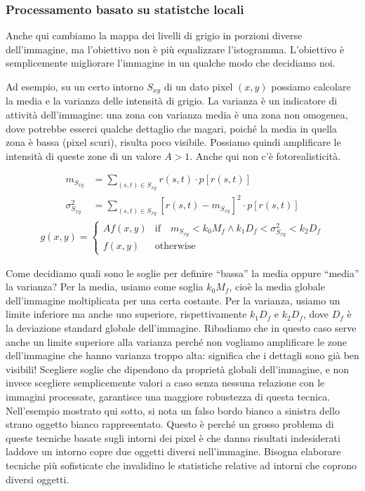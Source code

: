 \documentclass[a4paper,11pt]{article}
\begin{document}
\subsubsection{Processamento basato su statistche locali}
Anche qui cambiamo la mappa dei livelli di grigio in porzioni diverse dell'immagine, ma l'obiettivo non è più equalizzare
l'istogramma. L'obiettivo è semplicemente migliorare l'immagine in un qualche modo che decidiamo noi.
\par
Ad esempio, su un certo intorno $S_{xy}$ di un dato pixel $(x,y)$ possiamo calcolare la media e la varianza delle intensità di grigio.
La varianza è un indicatore di attività dell'immagine: una zona con varianza media è una zona non omogenea, dove potrebbe esserci
qualche dettaglio che magari, poiché la media in quella zona è bassa (pixel scuri), risulta poco visibile. Possiamo quindi amplificare le intensità di queste zone
di un valore $A > 1$. Anche qui non c'è fotorealisticità.

\begin{align*}
m_{S_{xy}} &= \sum_{(s,t) \in S_{xy}} r(s,t) \cdot p[r(s,t)] \\
\sigma^2_{S_{xy}} &= \sum_{(s,t) \in S_{xy}} [r(s,t) - m_{S_{xy}}]^2 \cdot p[r(s,t)]
\end{align*}
\begin{align*}
g(x,y) =  \begin{cases}
        Af(x,y) & \text{if} \quad m_{S_{xy}} < k_0 M_f \land k_1 D_f < \sigma^2_{S_{xy}} < k_2 D_f \\
        f(x,y) & \text{otherwise}
    \end{cases}
\end{align*}

Come decidiamo quali sono le soglie per definire ``bassa'' la media oppure ``media'' la varianza? Per la media, usiamo come
soglia $k_0 M_f$, cioè la media globale dell'immagine moltiplicata per una certa costante. Per la varianza, usiamo un limite inferiore ma
anche uno superiore, rispettivamente $k_1 D_f$ e $k_2 D_f$, dove $D_f$ è la deviazione standard globale dell'immagine.
Ribadiamo che in questo caso serve anche un limite superiore alla varianza perché non vogliamo amplificare le zone dell'immagine che hanno varianza
troppo alta: significa che i dettagli sono già ben visibili! Scegliere soglie che dipendono da proprietà globali dell'immagine, e non invece
scegliere semplicemente valori a caso senza nessuna relazione con le immagini processate, garantisce una maggiore robustezza di questa tecnica.
Nell'esempio mostrato qui sotto, si nota un falso bordo bianco a sinistra dello strano oggetto bianco rappresentato. Questo
è perché un grosso problema di queste tecniche basate sugli intorni dei pixel è che danno risultati indesiderati laddove un intorno copre due oggetti
diversi nell'immagine. Bisogna elaborare tecniche più sofisticate che invalidino le statistiche relative ad intorni che coprono diversi oggetti.
\end{document}
